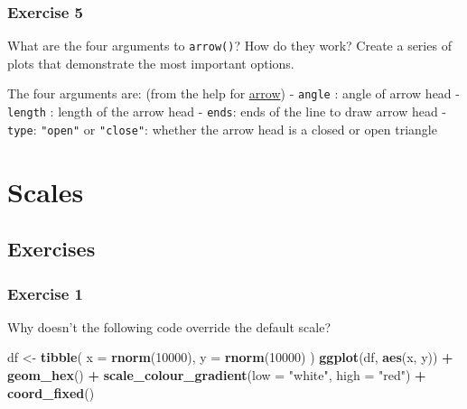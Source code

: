 \documentclass[]{book}
\newenvironment{Shaded}{\begin{snugshade}}{\end{snugshade}}
\newcommand{\DataTypeTok}[1]{\textcolor[rgb]{0.13,0.29,0.53}{#1}}
\newcommand{\DecValTok}[1]{\textcolor[rgb]{0.00,0.00,0.81}{#1}}
\newcommand{\KeywordTok}[1]{\textcolor[rgb]{0.13,0.29,0.53}{\textbf{#1}}}
\newcommand{\NormalTok}[1]{#1}
\newcommand{\OperatorTok}[1]{\textcolor[rgb]{0.81,0.36,0.00}{\textbf{#1}}}
\newcommand{\StringTok}[1]{\textcolor[rgb]{0.31,0.60,0.02}{#1}}
\theoremstyle{definition}
\theoremstyle{definition}
\theoremstyle{definition}
\theoremstyle{remark}
\begin{document}
\hypertarget{exercise-5-18}{%
\subsubsection{Exercise 5}\label{exercise-5-18}}

What are the four arguments to \texttt{arrow()}? How do they work?
Create a series of plots that demonstrate the most important options.

The four arguments are: (from the help for
\href{https://www.rdocumentation.org/packages/grid/versions/3.3.2/topics/arrow}{arrow})
- \texttt{angle} : angle of arrow head - \texttt{length} : length of the
arrow head - \texttt{ends}: ends of the line to draw arrow head -
\texttt{type}: \texttt{"open"} or \texttt{"close"}: whether the arrow
head is a closed or open triangle

\hypertarget{scales}{%
\section{Scales}\label{scales}}

\hypertarget{exercises-9}{%
\subsection{Exercises}\label{exercises-9}}

\hypertarget{exercise-1-70}{%
\subsubsection{Exercise 1}\label{exercise-1-70}}

Why doesn't the following code override the default scale?

\begin{Shaded}
\begin{Highlighting}[]
\NormalTok{df <-}\StringTok{ }\KeywordTok{tibble}\NormalTok{(}
  \DataTypeTok{x =} \KeywordTok{rnorm}\NormalTok{(}\DecValTok{10000}\NormalTok{),}
  \DataTypeTok{y =} \KeywordTok{rnorm}\NormalTok{(}\DecValTok{10000}\NormalTok{)}
\NormalTok{)}
\KeywordTok{ggplot}\NormalTok{(df, }\KeywordTok{aes}\NormalTok{(x, y)) }\OperatorTok{+}
\StringTok{  }\KeywordTok{geom_hex}\NormalTok{() }\OperatorTok{+}
\StringTok{  }\KeywordTok{scale_colour_gradient}\NormalTok{(}\DataTypeTok{low =} \StringTok{"white"}\NormalTok{, }\DataTypeTok{high =} \StringTok{"red"}\NormalTok{) }\OperatorTok{+}
\StringTok{  }\KeywordTok{coord_fixed}\NormalTok{()}
\end{Highlighting}
\end{Shaded}
\end{document}
